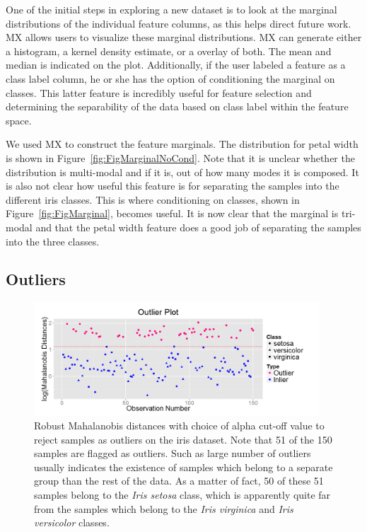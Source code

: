 \documentclass[review]{siamart0516}
\begin{document}
One of the initial steps in exploring a new dataset is to look at the marginal distributions of the individual feature columns, as this helps direct future work. MX allows users to visualize these marginal distributions. MX can generate either a histogram, a kernel density estimate, or a overlay of both. The mean and median is indicated on the plot. Additionally, if the user labeled a feature as a class label column, he or she has the option of conditioning the marginal on classes. This latter feature is incredibly useful for feature selection and determining the separability of the data based on class label within the feature space.

We used MX to construct the feature marginals. The distribution for petal width is shown in Figure~\ref{fig:FigMarginalNoCond}. Note that it is unclear whether the distribution is multi-modal and if it is, out of how many modes it is composed. It is also not clear how useful this feature is for separating the samples into the different iris classes. This is where conditioning on classes, shown in Figure~\ref{fig:FigMarginal}, becomes useful. It is now clear that the marginal is tri-modal and that the petal width feature does a good job of separating the samples into the three classes.

\subsection{Outliers}
\label{subsec:SubSecOutliers}

\begin{figure}[t!]
	\centering
	\includegraphics[width=0.95\textwidth]{Figures/Iris/OutliersIris.png}
	\caption{Robust Mahalanobis distances with choice of alpha cut-off value to reject samples as outliers on the iris dataset. Note that 51 of the 150 samples are flagged as outliers. Such as large number of outliers usually indicates the existence of samples which belong to a separate group than the rest of the data. As a matter of fact, 50 of these 51 samples belong to the \textit{Iris setosa} class, which is apparently quite far from the samples which belong to the \textit{Iris virginica} and \textit{Iris versicolor} classes.}
	\label{fig:FigOutliers}
\end{figure}
\end{document}
